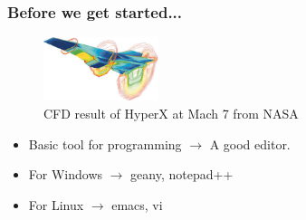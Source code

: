 \begin{frame}
\frametitle{Before we get started...}
\begin{center}
\begin{figure}
\includegraphics[width=0.3\textwidth]{CFD-NASA-HyperX.png}
\caption{CFD result of HyperX at Mach 7 from NASA}
\end{figure}
\end{center}

\begin{itemize}
\item Basic tool for programming $\longrightarrow$ A good editor.
\item For Windows $\longrightarrow$ geany, notepad++
\item For Linux $\longrightarrow$ emacs, vi 
\end{itemize}

\end{frame}
